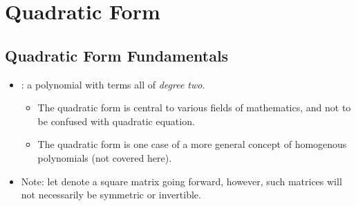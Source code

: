 \chapter{Quadratic Form}\label{Quadratic Form}
\section{Quadratic Form Fundamentals}\label{Quadratic Form Fundamentals}
\begin{itemize}
  \item {}: a polynomial with terms all of \emph{degree two}.
    \begin{itemize}
      \item The quadratic form is central to various fields of mathematics, and not to be confused with quadratic equation.
      \item The quadratic form is one case of a more general concept of homogenous polynomials (not covered here).
    \end{itemize}
  \item Note: let  denote a square matrix going forward, however, such matrices will not necessarily be symmetric or invertible.

\end{itemize}
